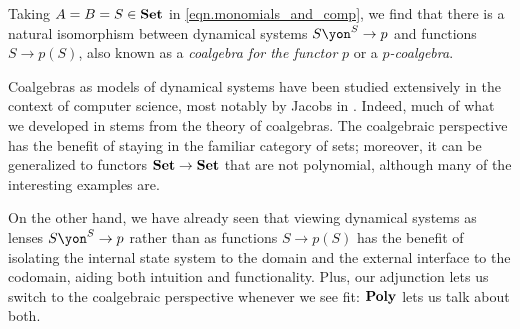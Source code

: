 \documentclass[Book-Poly]{subfiles}
\begin{document}

\begin{example} \label{ex.coalgebras}
Taking $A=B=S\in\mathbf{Set}$ in \eqref{eqn.monomials_and_comp}, we find that there is a natural isomorphism between dynamical systems $S\yon^S\to p$ and functions $S\to p(S)$, also known as a \emph{coalgebra for the functor} $p$ or a $p$\emph{-coalgebra}.

Coalgebras as models of dynamical systems have been studied extensively in the context of computer science, most notably by Jacobs in \cite{jacobs2017introduction}.
Indeed, much of what we developed in \label{sec.poly.dyn_sys.moore,sec.poly.dyn_sys.depend_sys} stems from the theory of coalgebras.
The coalgebraic perspective has the benefit of staying in the familiar category of sets; moreover, it can be generalized to functors $\mathbf{Set}\to\mathbf{Set}$ that are not polynomial, although many of the interesting examples are.

On the other hand, we have already seen that viewing dynamical systems as lenses $S\yon^S\to p$ rather than as functions $S\to p(S)$ has the benefit of isolating the internal state system to the domain and the external interface to the codomain, aiding both intuition and functionality.
Plus, our adjunction lets us switch to the coalgebraic perspective whenever we see fit: $\mathbf{Poly}$ lets us talk about both.
\end{example}
\end{document}
